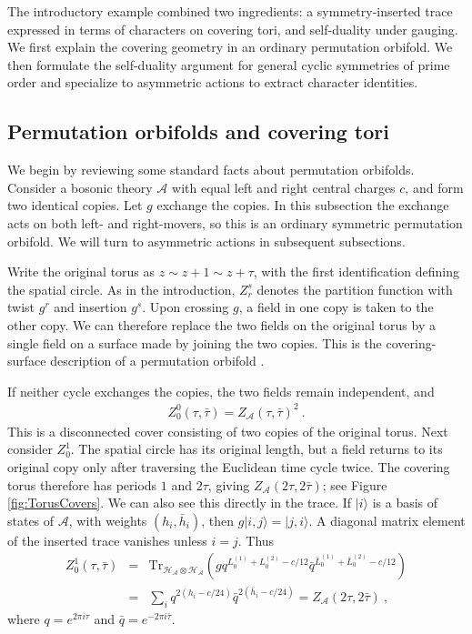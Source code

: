\documentclass[12pt]{article}
\numberwithin{equation}{section}
\newcommand{\bea}{\begin{eqnarray}}
\newcommand{\eea}{\end{eqnarray}}
\def\no{\nonumber}
\def\cA{\mathcal{A}}
\def\cH{\mathcal{H}}
\newcommand{\Tr}{\mathrm{Tr}}
\theoremstyle{remark}
\begin{document}
 The introductory example combined two ingredients: a symmetry-inserted trace expressed in terms of characters on covering tori, and self-duality under gauging. We first explain the covering geometry in an ordinary permutation orbifold. We then formulate the self-duality argument for general cyclic symmetries of prime order and specialize to asymmetric actions to extract character identities. 

\subsection{Permutation orbifolds and covering tori}
\label{sec:PermutationCovers}



We begin by reviewing some standard facts about permutation orbifolds. Consider a bosonic theory $\cA$ with equal left and right central charges $c$, and form two identical copies. Let $g$ exchange the copies. In this subsection the exchange acts on both left- and right-movers, so this is an ordinary symmetric permutation orbifold. We will turn to asymmetric actions in subsequent subsections.

Write the original torus as $z\sim z+1\sim z+\tau$, with the first identification defining the spatial circle. As in the introduction, $Z^s_r$ denotes the partition function with twist $g^r$ and insertion $g^s$. Upon crossing $g$, a field in one copy is taken to the other copy. We can therefore replace the two fields on the original torus by a single field on a surface made by joining the two copies. This is the covering-surface description of a permutation orbifold \cite{Bantay:1997ek}.

If neither cycle exchanges the copies, the two fields remain independent, and
\bea \label{eq:PermutationDisconnected}
Z^0_0(\tau,\bar\tau)=Z_{\cA}(\tau,\bar\tau)^2~.
\eea
This is a disconnected cover consisting of two copies of the original torus. 
Next consider $Z^1_0$. The spatial circle has its original length, but a field returns to its original copy only after traversing the Euclidean time cycle twice. The covering torus therefore has periods $1$ and $2\tau$, giving $Z_{\cA}(2\tau,2\bar\tau)$; see Figure \ref{fig:TorusCovers}. We can also see this directly in the trace. If $|i\rangle$ is a basis of states of $\cA$, with weights $(h_i,\bar h_i)$, then $g|i,j\rangle=|j,i\rangle$. A diagonal matrix element of the inserted trace vanishes unless $i=j$. Thus
\bea
Z^1_0(\tau,\bar\tau)&=&\Tr_{\cH_{\cA}\otimes\cH_{\cA}}\!\left(gq^{L_0^{(1)}+L_0^{(2)}-c/12}\bar q^{\bar L_0^{(1)}+\bar L_0^{(2)}-c/12}\right)\no\\
&=&\sum_i q^{2(h_i-c/24)}\bar q^{2(\bar h_i-c/24)}=Z_{\cA}(2\tau,2\bar\tau)~,
\eea
where $q=e^{2\pi i\tau}$ and $\bar q=e^{-2\pi i\bar\tau}$.
\end{document}
